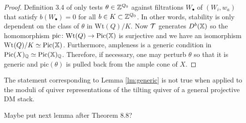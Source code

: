 \documentclass[12pt]{amsart}
\begin{document}
\begin{proof}
Definition 3.4 of \cite{Abd} only tests $\theta \in \mathbb{Z}^{Q_0}$ against filtrations $W_\bullet$ of $(W_i, w_a)$ that satisfy $b(W_\bullet)=0$ for all $b\in K \subset \mathbb{Z}^{Q_0}$.
In other words, stability is only dependent on the class of $\theta$ in Wt$(Q)/K$. Now $\mathcal{T}$ generates $D^b(\mathbb{X})$ so the homomorphism $\text{pic}\colon \text{Wt}(Q) \rightarrow \operatorname{Pic}(\mathbb{X})$ is surjective and we have an isomorphism Wt$(Q)/K \simeq \operatorname{Pic}(\mathbb{X})$.
Furthermore, ampleness is a generic condition in $\operatorname{Pic}(X)_{\mathbb{Q}} \simeq \operatorname{Pic}(\mathbb{X})_{\mathbb{Q}}$.
Therefore, if necessary, one may perturb $\theta$ so that it is generic and $\text{pic}(\theta)$ is pulled back from the ample cone of $X$.
\end{proof}

\begin{remark}\label{rm:generic}
The statement corresponding to Lemma \ref{lm:generic} is not true when applied to the moduli of quiver representations of the tilting quiver of a general projective DM stack.
\end{remark}


{\red Maybe put next lemma after Theorem 8.8?}


\end{document}
